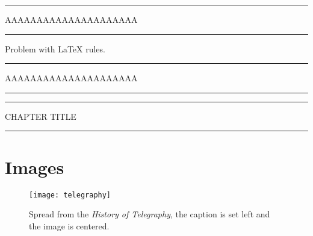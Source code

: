 \begin{texexample}{}{}
\makeatletter
\hrule width 5cm \p@
AAAAAAAAAAAAAAAAAAAAA
\vskip2.6pt\hrule width 5cm
\medskip

Problem with LaTeX rules.

\rule{5cm}{0.4pt}\par
AAAAAAAAAAAAAAAAAAAAA\par%
\rule[6.5pt]{5cm}{0.4pt}

\def\rule{\@ifnextchar[\@rule{\@rule[\z@]}}
\def\@rule[#1]#2#3{%
 \leavevmode
 \hbox{%
 \setlength\@tempdima{#1}%
 \setlength\@tempdimb{#2}%
 \setlength\@tempdimc{#3}%
 \advance\@tempdimc\@tempdima%
 \vrule\@width\@tempdimb\@height\@tempdimc\@depth-\@tempdima}}

\def\thickrule{\leavevmode \leaders \hrule height 3pt \hfill \kern \z@}

{\color{teal}\hrule width 10.5cm height3pt \p@
    {{\color{black!80}\HUGE CHAPTER TITLE}}\vskip3pt
\hrule width 10.5cm height3pt}
\makeatother
\end{texexample}


\section{Images}

\begin{figure}[htbp]
\centering
\texttt{[image: telegraphy]}
\caption{Spread from the \textit{History of Telegraphy}, the caption is set left and the image is centered.}
\end{figure}
